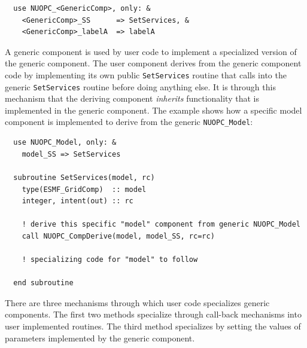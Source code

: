 \begin{verbatim}
  use NUOPC_<GenericComp>, only: &
    <GenericComp>_SS      => SetServices, &
    <GenericComp>_labelA  => labelA
\end{verbatim}

A generic component is used by user code to implement a specialized version of the generic component. The user component derives from the generic component code by implementing its own public {\tt SetServices} routine that calls into the generic {\tt SetServices} routine before doing anything else. It is through this mechanism that the deriving component {\em inherits} functionality that is implemented in the generic component. The example shows how a specific model component is implemented to derive from the generic {\tt NUOPC\_Model}:

\begin{verbatim}
  use NUOPC_Model, only: &
    model_SS => SetServices

  subroutine SetServices(model, rc)
    type(ESMF_GridComp)  :: model
    integer, intent(out) :: rc

    ! derive this specific "model" component from generic NUOPC_Model
    call NUOPC_CompDerive(model, model_SS, rc=rc)

    ! specializing code for "model" to follow
    
  end subroutine
\end{verbatim}

There are three mechanisms through which user code specializes generic components. The first two methods specialize through call-back mechanisms into user implemented routines. The third method specializes by setting the values of parameters implemented by the generic component.

